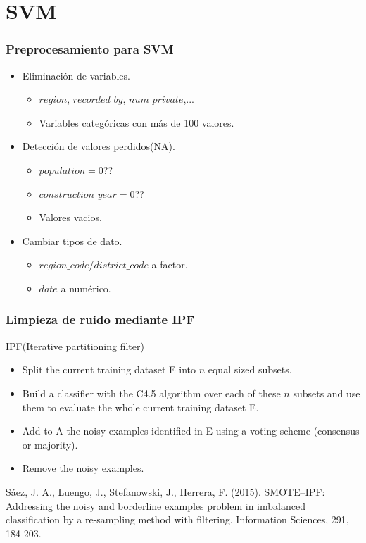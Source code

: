 \section{SVM}

\begin{frame}
\frametitle{Preprocesamiento para SVM}

\begin{itemize}
	\item Eliminación de variables. 
	\begin{itemize}
		\item $region$, $recorded\_by$, $num\_private$,...
		\item Variables categóricas con más de 100 valores.
	\end{itemize}
	\pause
	\item Detección de valores perdidos(NA).
	\begin{itemize}
		\item $population = 0$??
		\item $construction\_year = 0$??
		\item Valores vacios.
	\end{itemize}
	\pause
	\item Cambiar tipos de dato.
	\begin{itemize}
		\item $region\_code$/$district\_code$ a factor.
		\item $date$ a numérico.
	\end{itemize}
\end{itemize}



\end{frame}

\begin{frame}

\frametitle{Limpieza de ruido mediante IPF}

	
	\begin{exampleblock}{IPF(Iterative partitioning filter)}
	
		\begin{itemize}
			\item Split the current training dataset E into $n$ equal sized subsets.
			\item  Build a classifier with the C4.5 algorithm over each of these $n$ subsets and use them to evaluate the whole current training dataset E.
			\item Add to A the noisy examples identified in E using a voting scheme (consensus or majority).
			\item Remove the noisy examples.
			
		\end{itemize}
		Sáez, J. A., Luengo, J., Stefanowski, J.,  Herrera, F. (2015). SMOTE–IPF: Addressing the noisy and borderline examples problem in imbalanced classification by a re-sampling method with filtering. Information Sciences, 291, 184-203.
	\end{exampleblock}

	


\end{frame}

